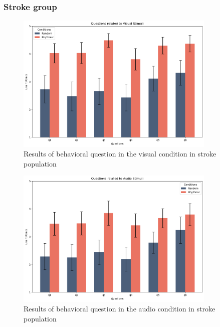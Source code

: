 \subsubsection*{Stroke group}
\begin{figure}[H]
    \centering
    \includegraphics[width=0.85\textwidth]{bar_plots/plotbar_visual_s.png}
    \caption{Results of behavioral question in the visual condition in stroke population}
    \label{fig: bar_visual_stroke} 
\end{figure} 
\begin{figure}[H]
    \centering
    \includegraphics[width=0.85\textwidth]{bar_plots/plotbar_audio_s.png}
    \caption{Results of behavioral question in the audio condition in stroke population}
    \label{fig: bar_audio_stroke} 
\end{figure} 
